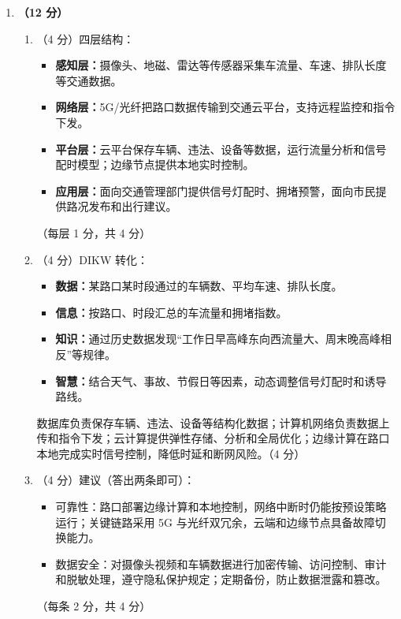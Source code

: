 \documentclass[a4paper,11pt]{article}
\begin{document}
\begin{enumerate}[start=29, label=\textbf{\arabic*.}, leftmargin=2.4em, itemsep=0.55em]
\item \textbf{（12 分）}
\begin{enumerate}[label=（\arabic*）, leftmargin=2.2em, itemsep=2pt]
  \item （4 分）四层结构：
  \begin{itemize}[leftmargin=1.8em, itemsep=1pt]
    \item \textbf{感知层：}摄像头、地磁、雷达等传感器采集车流量、车速、排队长度等交通数据。
    \item \textbf{网络层：}5G/光纤把路口数据传输到交通云平台，支持远程监控和指令下发。
    \item \textbf{平台层：}云平台保存车辆、违法、设备等数据，运行流量分析和信号配时模型；边缘节点提供本地实时控制。
    \item \textbf{应用层：}面向交通管理部门提供信号灯配时、拥堵预警，面向市民提供路况发布和出行建议。
  \end{itemize}
  \hfill（每层 1 分，共 4 分）

  \item （4 分）DIKW 转化：
  \begin{itemize}[leftmargin=1.8em, itemsep=1pt]
    \item \textbf{数据：}某路口某时段通过的车辆数、平均车速、排队长度。
    \item \textbf{信息：}按路口、时段汇总的车流量和拥堵指数。
    \item \textbf{知识：}通过历史数据发现“工作日早高峰东向西流量大、周末晚高峰相反”等规律。
    \item \textbf{智慧：}结合天气、事故、节假日等因素，动态调整信号灯配时和诱导路线。
  \end{itemize}
  数据库负责保存车辆、违法、设备等结构化数据；计算机网络负责数据上传和指令下发；云计算提供弹性存储、分析和全局优化；边缘计算在路口本地完成实时信号控制，降低时延和断网风险。\hfill（4 分）

  \item （4 分）建议（答出两条即可）：
  \begin{itemize}[leftmargin=1.8em, itemsep=1pt]
    \item 可靠性：路口部署边缘计算和本地控制，网络中断时仍能按预设策略运行；关键链路采用 5G 与光纤双冗余，云端和边缘节点具备故障切换能力。
    \item 数据安全：对摄像头视频和车辆数据进行加密传输、访问控制、审计和脱敏处理，遵守隐私保护规定；定期备份，防止数据泄露和篡改。
  \end{itemize}
  \hfill（每条 2 分，共 4 分）
\end{enumerate}

\end{enumerate}
\end{document}

